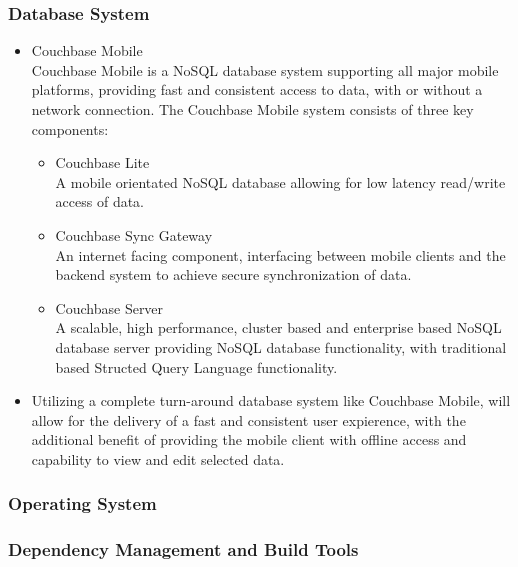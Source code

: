 \documentclass[a4paper,10pt]{article}
\begin{document}
\subsubsection{Database System}
	\begin{itemize}
		\item Couchbase Mobile\\
		Couchbase Mobile is a NoSQL database system supporting all major mobile platforms, providing fast and consistent access to data, with or without a network connection. The Couchbase Mobile system consists of three key components:
		\begin{itemize}
			\item Couchbase Lite\\
			A mobile orientated NoSQL database allowing for low latency read/write access of data.
			\item Couchbase Sync Gateway\\
			An internet facing component, interfacing between mobile clients and the backend system to achieve secure synchronization of data.
			\item Couchbase Server\\
			A scalable, high performance, cluster based and enterprise based NoSQL database server providing NoSQL database functionality, with traditional based Structed Query Language functionality.
		\end{itemize}

		\item Utilizing a complete turn-around database system like Couchbase Mobile, will allow for the delivery of a fast and consistent user expierence, with the additional benefit of providing the mobile client with offline access and capability to view and edit selected data. 
	\end{itemize}

\subsubsection{Operating System}
\subsubsection{Dependency Management and Build Tools}
\end{document}
